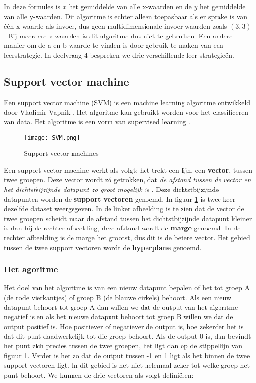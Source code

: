In deze formules is $\bar{x}$ het gemiddelde van alle x-waarden en de $\bar{y}$ het gemiddelde van alle y-waarden. 
Dit algoritme is echter alleen toepasbaar als er sprake is van \'{e}\'{e}n x-waarde als invoer, dus geen multidimensionale invoer waarden zoals $(3,3)$. Bij meerdere x-waarden is dit algoritme dus niet te gebruiken. Een andere manier om de a en b waarde te vinden is door gebruik te maken van een leerstrategie. In deelvraag 4 bespreken we drie verschillende leer strategie\"en.

\subsection{Support vector machine}
Een support vector machine (SVM) is een machine learning algoritme ontwikkeld door Vladimir Vapnik \cite{VladimirVapnik}. Het algoritme kan gebruikt worden voor het classificeren van data. Het algoritme is een vorm van supervised learning \cite{SVM}.

\begin{figure}[h]
  \centering
    \texttt{[image: SVM.png]}
  \caption{Support vector machines}
  \label{fig:SupVectorMachine1}
\end{figure}

Een support vector machine werkt als volgt: het trekt een lijn, een \textbf{vector}, tussen twee groepen. Deze vector wordt z\'o getrokken, dat \textit{de afstand tussen de vector en het dichtstbijzijnde datapunt zo groot mogelijk is} \cite{SVM2}. Deze dichtstbijzijnde datapunten worden de \textbf{support vectoren} genoemd. In figuur \ref{fig:SupVectorMachine1} is twee keer dezelfde dataset weergegeven. In de linker afbeelding is te zien dat de vector de twee groepen scheidt maar de afstand tussen het dichtstbijzijnde datapunt kleiner is dan bij de rechter afbeelding, deze afstand wordt de \textbf{marge} genoemd. In de rechter afbeelding is de marge het grootst, dus dit is de betere vector. Het gebied tussen de twee support vectoren wordt de \textbf{hyperplane} genoemd.

\subsubsection{Het agoritme}
Het doel van het algoritme is van een nieuw datapunt bepalen of het tot groep A (de rode vierkantjes) of groep B (de blauwe cirkels) behoort. Als een nieuw datapunt behoort tot groep A dan willen we dat de output van het algoritme negatief is en als het nieuwe datapunt behoort tot groep B willen we dat de output positief is. Hoe positiever of negatiever de output is, hoe zekerder het is dat dit punt daadwerkelijk tot die groep behoort. Als de output 0 is, dan bevindt het punt zich precies tussen de twee groepen, het ligt dan op de stippellijn van figuur \ref{fig:SupVectorMachine1}. Verder is het zo dat de output tussen -1 en 1 ligt als het binnen de twee support vectoren ligt. In dit gebied is het niet helemaal zeker tot welke groep het punt behoort. 
We kunnen de drie vectoren als volgt defini\"eren: 

